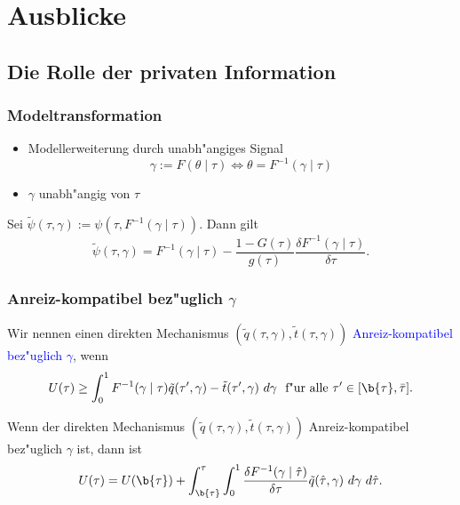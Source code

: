 \section{Ausblicke}

\subsection{Die Rolle der privaten Information}
\begin{frame}
\frametitle{Modeltransformation}
\justifying
\begin{itemize}
  \item Modellerweiterung durch unabh"angiges Signal
  \begin{equation*}
    \gamma := F(\theta \mid \tau) \Leftrightarrow \theta = F^{-1}(\gamma \mid \tau)
  \end{equation*}
  \item $\gamma$ unabh"angig von $\tau$
\end{itemize}
\begin{thmL}
  Sei $\tilde{\psi}(\tau, \gamma) := \psi(\tau, F^{-1}(\gamma \mid \tau))$. Dann gilt
  \begin{equation*}
    \tilde{\psi}(\tau, \gamma) = F^{-1}(\gamma \mid \tau) - \dfrac{1-G(\tau)}{g(\tau)} \dfrac{\delta F^{-1}(\gamma \mid \tau)}{\delta \tau}.
  \end{equation*}
\end{thmL}
\end{frame}

\begin{frame}
\frametitle{Anreiz-kompatibel bez"uglich $\gamma$}
\justifying
\begin{thmD}
  Wir nennen einen direkten Mechanismus $(\tilde{q}(\tau, \gamma), \tilde{t}(\tau, \gamma))$ \textcolor{blue}{Anreiz-kompatibel bez"uglich $\gamma$}, wenn
  \begin{equation*}
    U(\tau) \geq \int_{0}^{1} F^{-1}(\gamma \mid \tau) \tilde{q}(\tau', \gamma) - \tilde{t}(\tau', \gamma) \ d \gamma \text{~ f"ur alle } \tau' \in [\b{\tau}, \bar{\tau}].
  \end{equation*}
\end{thmD}
\begin{thmP}
  Wenn der direkten Mechanismus $(\tilde{q}(\tau, \gamma), \tilde{t}(\tau, \gamma))$ Anreiz-kompatibel bez"uglich $\gamma$ ist, dann ist
  \begin{equation*}
    U(\tau) = U(\b{\tau}) + \int_{\b{\tau}}^{\tau} \int_{0}^{1} \dfrac{\delta F^{-1}(\gamma \mid \hat{\tau})}{\delta \tau} \tilde{q}(\hat{\tau}, \gamma) \ d \gamma \ d \hat{\tau}.
  \end{equation*}
\end{thmP}
\end{frame}

